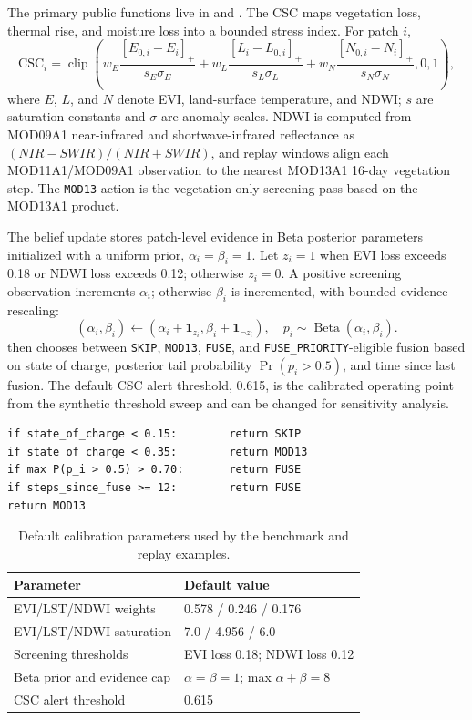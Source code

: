 \documentclass[preprint,12pt,a4paper]{elsarticle}
\begin{document}
The primary public functions live in  and . The CSC maps vegetation loss, thermal rise, and moisture loss into a bounded stress index. For patch $i$,
\[
\mathrm{CSC}_i=\operatorname{clip}\left(
w_E\frac{[E_{0,i}-E_i]_+}{s_E\sigma_E}
+w_L\frac{[L_i-L_{0,i}]_+}{s_L\sigma_L}
+w_N\frac{[N_{0,i}-N_i]_+}{s_N\sigma_N},
0,1\right),
\]
where $E$, $L$, and $N$ denote EVI, land-surface temperature, and NDWI; $s$ are saturation constants and $\sigma$ are anomaly scales. NDWI is computed from MOD09A1 near-infrared and shortwave-infrared reflectance as $(NIR-SWIR)/(NIR+SWIR)$, and replay windows align each MOD11A1/MOD09A1 observation to the nearest MOD13A1 16-day vegetation step. The \texttt{MOD13} action is the vegetation-only screening pass based on the MOD13A1 product.

The belief update stores patch-level evidence in Beta posterior parameters initialized with a uniform prior, $\alpha_i=\beta_i=1$. Let $z_i=1$ when EVI loss exceeds 0.18 or NDWI loss exceeds 0.12; otherwise $z_i=0$. A positive screening observation increments $\alpha_i$; otherwise $\beta_i$ is incremented, with bounded evidence rescaling:
\[
(\alpha_i,\beta_i)\leftarrow(\alpha_i+\mathbf{1}_{z_i},\beta_i+\mathbf{1}_{\neg z_i}), \quad
p_i \sim \operatorname{Beta}(\alpha_i,\beta_i).
\]
 then chooses between \texttt{SKIP}, \texttt{MOD13}, \texttt{FUSE}, and \texttt{FUSE\_PRIORITY}-eligible fusion based on state of charge, posterior tail probability $\Pr(p_i>0.5)$, and time since last fusion. The default CSC alert threshold, 0.615, is the calibrated operating point from the synthetic threshold sweep and can be changed for sensitivity analysis.

\begin{verbatim}
if state_of_charge < 0.15:        return SKIP
if state_of_charge < 0.35:        return MOD13
if max P(p_i > 0.5) > 0.70:       return FUSE
if steps_since_fuse >= 12:        return FUSE
return MOD13
\end{verbatim}

\begin{table}[!h]
\centering
\small
\begin{tabular}{ll}
\toprule
Parameter & Default value \\
\midrule
EVI/LST/NDWI weights & 0.578 / 0.246 / 0.176 \\
EVI/LST/NDWI saturation & 7.0 / 4.956 / 6.0 \\
Screening thresholds & EVI loss 0.18; NDWI loss 0.12 \\
Beta prior and evidence cap & $\alpha=\beta=1$; max $\alpha+\beta=8$ \\
CSC alert threshold & 0.615 \\
\bottomrule
\end{tabular}
\caption{Default calibration parameters used by the benchmark and replay examples.}
\label{tab:calibration}
\end{table}
\end{document}

